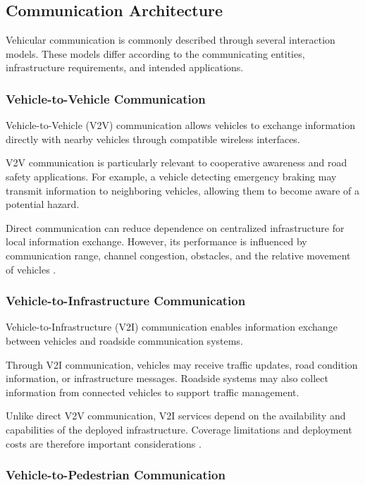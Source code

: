 \subsection{Communication Architecture}
\label{sec:2B}

Vehicular communication is commonly
described through several interaction
models. These models differ according
to the communicating entities,
infrastructure requirements,
and intended applications.

\subsubsection{Vehicle-to-Vehicle Communication}

Vehicle-to-Vehicle (V2V) communication
allows vehicles to exchange information
directly with nearby vehicles through
compatible wireless interfaces.

V2V communication is particularly
relevant to cooperative awareness
and road safety applications.
For example, a vehicle detecting
emergency braking may transmit
information to neighboring vehicles,
allowing them to become aware
of a potential hazard.

Direct communication can reduce
dependence on centralized
infrastructure for local
information exchange. However,
its performance is influenced
by communication range,
channel congestion, obstacles,
and the relative movement
of vehicles \cite{Hartenstein2008}.

\subsubsection{Vehicle-to-Infrastructure Communication}

Vehicle-to-Infrastructure (V2I)
communication enables information
exchange between vehicles and
roadside communication systems.

Through V2I communication,
vehicles may receive traffic
updates, road condition
information, or infrastructure
messages. Roadside systems
may also collect information
from connected vehicles
to support traffic management.

Unlike direct V2V communication,
V2I services depend on the
availability and capabilities
of the deployed infrastructure.
Coverage limitations and
deployment costs are therefore
important considerations
\cite{Karagiannis2011}.

\subsubsection{Vehicle-to-Pedestrian Communication}

